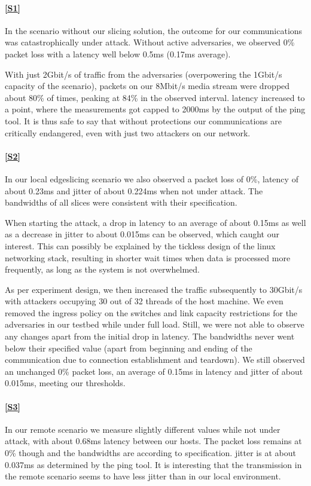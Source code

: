 \begin{description}[style=multiline, labelwidth=0.7cm]
    \paragraph{\ref{S1}} In the scenario without our slicing solution, the outcome for our communications was catastrophically under attack. Without active adversaries, we observed 0\% packet loss with a \gls{latency} well below 0.5ms (0.17ms average).

    With just 2Gbit/s of traffic from the adversaries (overpowering the 1Gbit/s capacity of the scenario), packets on our 8Mbit/s media stream were dropped about 80\% of times, peaking at 84\% in the observed interval. \Gls{latency} increased to a point, where the measurements got capped to 2000ms by the output of the ping tool. It is thus safe to say that without protections our communications are critically endangered, even with just two attackers on our network.

    \paragraph{\ref{S2}} In our local edgeslicing scenario we also observed a packet loss of 0\%, \gls{latency} of about 0.23ms and \gls{jitter} of about 0.224ms when not under attack. The \gls{bandwidth}s of all slices were consistent with their specification.

    When starting the attack, a drop in \gls{latency} to an average of about 0.15ms as well as a decrease in \gls{jitter} to about 0.015ms can be observed, which caught our interest. This can possibly be explained by the tickless design of the linux networking stack, resulting in shorter wait times when data is processed more frequently, as long as the system is not overwhelmed.

    As per experiment design, we then increased the traffic subsequently to 30Gbit/s with attackers occupying 30 out of 32 threads of the host machine. We even removed the ingress policy on the switches and link capacity restrictions for the adversaries in our testbed while under full load. Still, we were not able to observe any changes apart from the initial drop in \gls{latency}.
    The \gls{bandwidth}s never went below their specified value (apart from beginning and ending of the communication due to connection establishment and teardown). We still observed an unchanged 0\% packet loss, an average of 0.15ms in \gls{latency} and \gls{jitter} of about 0.015ms, meeting our thresholds.

    \paragraph{\ref{S3}} In our remote scenario we measure slightly different values while not under attack, with about 0.68ms \gls{latency} between our hosts. The packet loss remains at 0\% though and the \gls{bandwidth}s are according to specification. \Gls{jitter} is at about 0.037ms as determined by the ping tool. It is interesting that the transmission in the remote scenario seems to have less \gls{jitter} than in our local environment.


\end{description}
